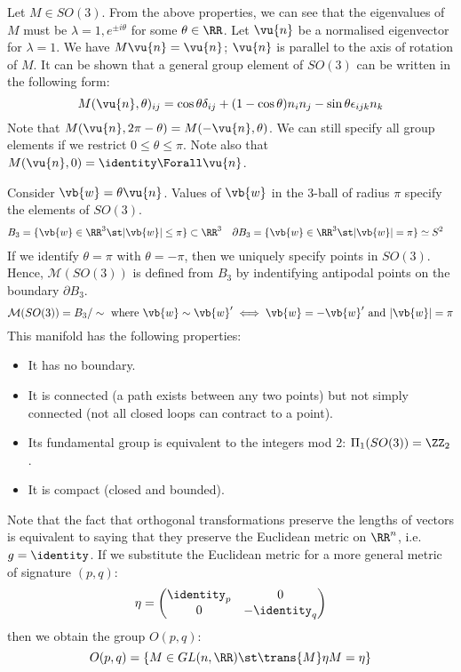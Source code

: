 \documentclass{jknotes}
\begin{document}
\begin{eg}
    Let \(M\in SO(3)\). From the above properties, we can see that the eigenvalues of \(M\) must be \(\lambda = 1, e^{\pm i\theta}\) for some \(\theta \in \RR\). Let \(\vu{n}\) be a normalised eigenvector for \(\lambda = 1\). We have \(M\vu{n}=\vu{n}\); \(\vu{n}\) is parallel to the axis of rotation of \(M\). It can be shown that a general group element of \(SO(3)\) can be written in the following form:
    \begin{equation}
        M(\vu{n},\theta)_{ij} = \cos\theta\delta_{ij} + (1 - \cos\theta)n_in_j - \sin\theta\epsilon_{ijk}n_k
    \end{equation}
    Note that \(M(\vu{n},2\pi-\theta) = M(-\vu{n},\theta)\). We can still specify all group elements if we restrict \(0 \le \theta \le \pi\). Note also that \(M(\vu{n},0) = \identity \Forall \vu{n}\).

    Consider \(\vb{w} = \theta \vu{n}\). Values of \(\vb{w}\) in the 3-ball of radius \(\pi\) specify the elements of \(SO(3)\).
    \begin{align}
        B_3 &= \{\vb{w} \in \RR^3 \st |\vb{w}| \le \pi\} \subset \RR^3
        &
        \partial B_3 &= \{\vb{w} \in \RR^3 \st |\vb{w}| = \pi\} \simeq S^2
    \end{align}
    If we identify \(\theta = \pi\) with \(\theta = - \pi\), then we uniquely specify points in \(SO(3)\). Hence, \(\mathcal{M}(SO(3))\) is defined from \(B_3\) by indentifying antipodal points on the boundary \(\partial B_3\).
    \begin{equation}
        \mathcal{M}(SO(3)) = B_3/\sim \text{ where } \vb{w} \sim \vb{w}' \iff \vb{w} = -\vb{w}' \text{ and } |\vb{w}| = \pi
    \end{equation}
    This manifold has the following properties:
    \begin{itemize}
        \item It has no boundary.
        \item It is connected (a path exists between any two points) but not simply connected (not all closed loops can contract to a point).
        \item Its fundamental group is equivalent to the integers mod 2: \(\Pi_1(SO(3)) = \ZZ_2\).
        \item It is compact (closed and bounded).
    \end{itemize}
\end{eg}

Note that the fact that orthogonal transformations preserve the lengths of vectors is equivalent to saying that they preserve the Euclidean metric on \(\RR^n\), i.e. \(g = \identity\). If we substitute the Euclidean metric for a more general metric of signature \((p,q)\):
\begin{equation}
    \eta = 
    \begin{pmatrix}
        \identity_p & 0 \\
        0 & -\identity_q
    \end{pmatrix}
\end{equation}
then we obtain the group \(O(p,q)\):
\begin{equation}
    O(p,q) = \{M\in GL(n,\RR) \st \trans{M}\eta M = \eta\}
\end{equation}
\end{document}
